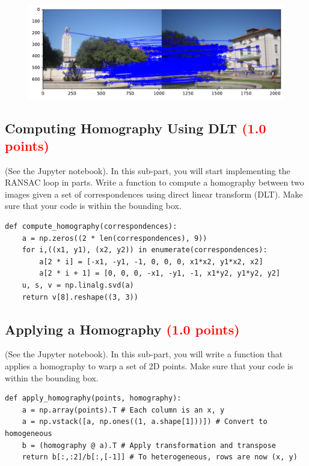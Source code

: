 \documentclass[answers]{exam}
\newcommand{\mypoints}[1]{\textcolor{red}{(#1 points)}}
\begin{document}
\begin{solution}
    \begin{figure}[H]
        \centering
        \includegraphics[width=\linewidth]{Data/Solutions/question_3_3.pdf}
    \end{figure}
\end{solution}

\subsection{Computing Homography Using DLT \mypoints{1.0}}
(See the Jupyter notebook). In this sub-part, you will start implementing the RANSAC loop in parts. Write a function to compute a homography between two images given a set of correspondences using direct linear transform (DLT). Make sure that your code is within the bounding box.

\begin{solution}
    \begin{verbatim}
def compute_homography(correspondences):
    a = np.zeros((2 * len(correspondences), 9))
    for i,((x1, y1), (x2, y2)) in enumerate(correspondences):
        a[2 * i] = [-x1, -y1, -1, 0, 0, 0, x1*x2, y1*x2, x2]
        a[2 * i + 1] = [0, 0, 0, -x1, -y1, -1, x1*y2, y1*y2, y2]
    u, s, v = np.linalg.svd(a)
    return v[8].reshape((3, 3))
    \end{verbatim}
    \end{solution}

\subsection{Applying a Homography \mypoints{1.0}}
(See the Jupyter notebook). In this sub-part, you will write a function that applies a homography to warp a set of 2D points. Make sure that your code is within the bounding box.

\begin{solution}
    \begin{verbatim}
def apply_homography(points, homography):
    a = np.array(points).T # Each column is an x, y
    a = np.vstack([a, np.ones((1, a.shape[1]))]) # Convert to homogeneous
    b = (homography @ a).T # Apply transformation and transpose
    return b[:,:2]/b[:,[-1]] # To heterogeneous, rows are now (x, y)
    \end{verbatim}
    \end{solution}
\end{document}
